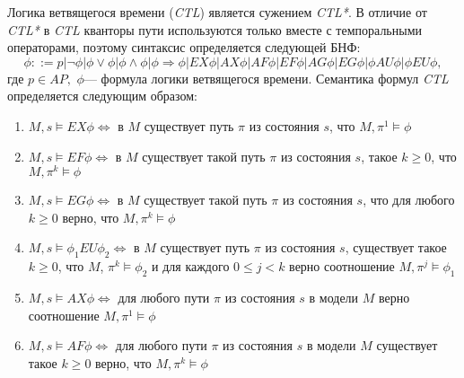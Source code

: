 \documentclass[12pt]{article}
\begin{document}
Логика ветвящегося времени (\textit{CTL}) является сужением \textit{CTL*}. В отличие от \textit{CTL*} в \textit{CTL} кванторы пути используются только вместе с темпоральными операторами, поэтому синтаксис определяется следующей БНФ:
$$\phi ::= p | \neg \phi | \phi \vee \phi | \phi \wedge \phi | 
\phi \Rightarrow \phi| EX\phi | AX\phi | AF\phi | EF\phi | AG\phi | EG\phi | \phi AU \phi|\phi EU \phi,$$
где $p \in AP,$ $\phi$— формула логики ветвящегося времени.
Семантика формул \textit{CTL} определяется следующим образом:
\begin{enumerate}
    
    \item $M, s \vDash EX\phi \Leftrightarrow$ в $M$ существует путь $\pi$ из состояния $s$, что  $M, \pi^{1} \vDash \phi$
    
    \item $M, s \vDash EF\phi \Leftrightarrow$ в $M$ существует такой путь $\pi$ из состояния $s$, такое $k \geq 0$, что $M, \pi^{k} \vDash \phi$ 
    
    \item $M, s \vDash EG\phi \Leftrightarrow$ в $M$ существует такой путь $\pi$ из состояния $s$, что для любого $k \geq 0$ верно, что $M, \pi^{k} \vDash \phi$ 
    
    \item $M, s \vDash \phi_1 EU \phi_2 \Leftrightarrow$ в $M$ существует путь $\pi$ из состояния $s$, существует такое $k \geq 0$, что $M$, $\pi^{k} \vDash \phi_2$ и для каждого $0 \leq j < k$ верно соотношение $M, \pi^{j} \vDash \phi_1$
    
    \item $M, s \vDash AX\phi \Leftrightarrow$ для любого пути $\pi$ из состояния $s$ в модели $M$ верно соотношение $M, \pi^{1} \vDash \phi$ 
    
    \item $M, s \vDash AF\phi \Leftrightarrow$ для любого пути $\pi$ из состояния $s$ в модели $M$ существует такое $k \geq 0$ верно, что $M, \pi^{k} \vDash \phi$ 
    

\end{enumerate}
\end{document}

